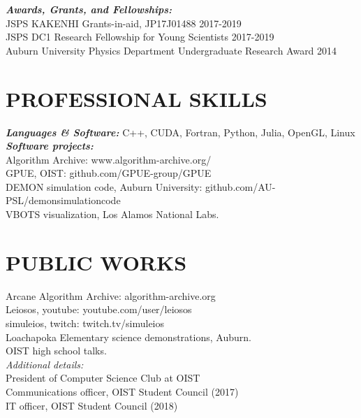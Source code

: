 \documentclass[margin, 10pt, a4paper]{res} %
\begin{document}
\begin{resume}
 {\sl \textbf{Awards, Grants, and Fellowships:}} \\
 JSPS KAKENHI Grants-in-aid, JP17J01488 \hfill 2017-2019 \\
 JSPS DC1 Research Fellowship for Young Scientists \hfill 2017-2019\\
 Auburn University Physics Department Undergraduate Research Award \hfill 2014


\section{PROFESSIONAL SKILLS} 


{\sl \textbf{Languages \& Software:}} 
C++, CUDA, Fortran, Python, Julia, OpenGL, Linux  \\

{\sl \textbf{Software projects:}} \\
Algorithm Archive: www.algorithm-archive.org/ \\
GPUE, OIST: github.com/GPUE-group/GPUE \\
DEMON simulation code, Auburn University: github.com/AU-PSL/demonsimulationcode \\
VBOTS visualization, Los Alamos National Labs. \\

\section{PUBLIC WORKS}

Arcane Algorithm Archive: algorithm-archive.org \\
Leiosos, youtube: youtube.com/user/leiosos \\
simuleios, twitch: twitch.tv/simuleios \\
Loachapoka Elementary science demonstrations, Auburn. \\
OIST high school talks.\\

{\sl Additional details:} \\
President of Computer Science Club at OIST \\
Communications officer, OIST Student Council (2017) \\
IT officer, OIST Student Council (2018)




\end{resume}
\end{document}
